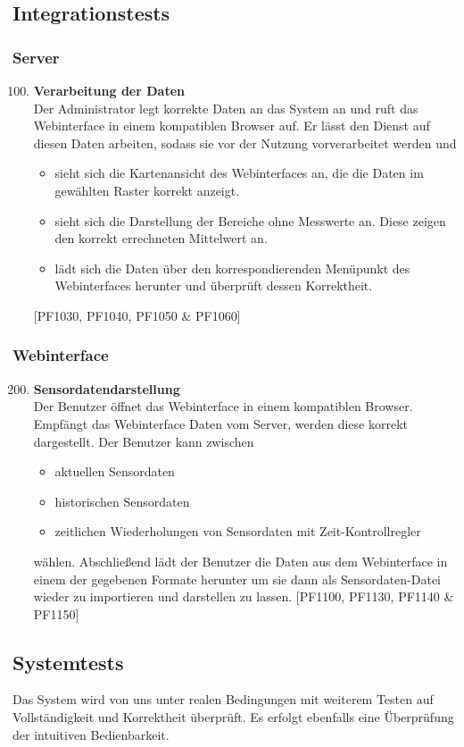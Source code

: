 \subsection{Integrationstests}
\subsubsection{Server}
\begin{enumerate}[label=\textbf{TI\arabic{enumi}0}]
	\setcounter{enumi}{99}
	
	\item \textbf{Verarbeitung der Daten}\\
	Der Administrator legt korrekte Daten an das System an und ruft das Webinterface in einem kompatiblen Browser auf. Er lässt den Dienst auf diesen Daten arbeiten, sodass sie vor der Nutzung vorverarbeitet werden und
	\begin{itemize}
		\item sieht sich die Kartenansicht des Webinterfaces an, die die Daten im gewählten Raster korrekt anzeigt.
		\item sieht sich die Darstellung der Bereiche ohne Messwerte an. Diese zeigen den korrekt errechneten Mittelwert an.
		\item lädt sich die Daten über den korrespondierenden Menüpunkt des Webinterfaces herunter und überprüft dessen Korrektheit.
	\end{itemize}
	[PF1030, PF1040, PF1050 \& PF1060]
	
\end{enumerate}

\subsubsection{Webinterface}
\begin{enumerate}[label=\textbf{TI\arabic{enumi}0}]
	\setcounter{enumi}{199}
	
	\item \textbf{Sensordatendarstellung}\\
	Der Benutzer öffnet das Webinterface in einem kompatiblen Browser. Empfängt das Webinterface Daten vom Server, werden diese korrekt dargestellt. Der Benutzer kann zwischen
	\begin{itemize}
		\item aktuellen Sensordaten
		\item historischen Sensordaten
		\item zeitlichen Wiederholungen von Sensordaten mit Zeit-Kontrollregler
	\end{itemize}
	wählen. Abschließend lädt der Benutzer die Daten aus dem Webinterface in einem der gegebenen Formate herunter um sie dann  als Sensordaten-Datei wieder zu importieren und darstellen zu lassen. [PF1100, PF1130, PF1140 \& PF1150]
	
\end{enumerate}

\subsection{Systemtests}
Das System wird von uns unter realen Bedingungen mit weiterem Testen auf Vollständigkeit und Korrektheit überprüft. Es erfolgt ebenfalls eine Überprüfung der intuitiven Bedienbarkeit.